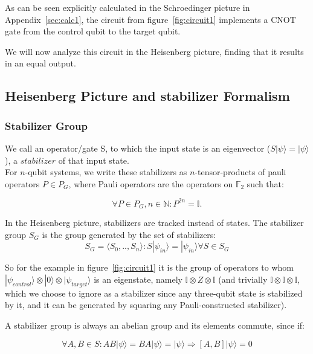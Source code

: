 As can be seen explicitly calculated in the Schroedinger 
picture in Appendix~\ref{sec:calc1}, the circuit from figure~\ref{fig:circuit1}
implements a CNOT gate from the control qubit to the target qubit.

We will now analyze this circuit in the Heisenberg picture,
finding that it results in an equal output.

\subsection{Heisenberg Picture and stabilizer Formalism}
\subsubsection{Stabilizer Group}
We call an operator/gate S, to which the input state is an
eigenvector ($S|\psi\rangle=|\psi\rangle$), a $stabilizer$ of that input state. \\


For $n$-qubit systems, we write these stabilizers as $n$-tensor-products 
of pauli operators $P \in P_{G}$,
where Pauli operators are the operators on $\mathbb{F}_{2}$ such that:

\begin{equation}
    \forall P\in P_{G}, n\in \mathbb{N}: P^{2n}=\mathbb{I}.
\end{equation}

In the Heisenberg picture, stabilizers are tracked instead of
states. 
The stabilizer group $S_{G}$ is the group generated by
the set of stabilizers:
\begin{equation}
	S_{G} = \langle S_{0},..,S_{n}\rangle: S|\psi_{in}\rangle = 
	|\psi_{in}\rangle \forall S \in S_{G}
\end{equation}

So for the example in figure~\ref{fig:circuit1} it is the group
of operators to whom
$|\psi_{control}\rangle \otimes |0\rangle \otimes 
|\psi_{target}\rangle$ is an eigenstate, namely 
$\mathbb{I}\otimes Z \otimes \mathbb{I}$ (and trivially
$\mathbb{I}\otimes\mathbb{I}\otimes\mathbb{I}$, which we choose
to ignore as a stabilizer since any three-qubit state
is stabilized by it, and it can be generated by squaring any
Pauli-constructed stabilizer).

A stabilizer group is always an abelian group and its elements 
 commute, since if:

\begin{equation}
	\label{abelian_stabilizers_equation}
	\forall A,B \in S: AB|\psi\rangle = BA|\psi\rangle = |\psi\rangle
	\Rightarrow [A,B]|\psi\rangle=0
\end{equation}

